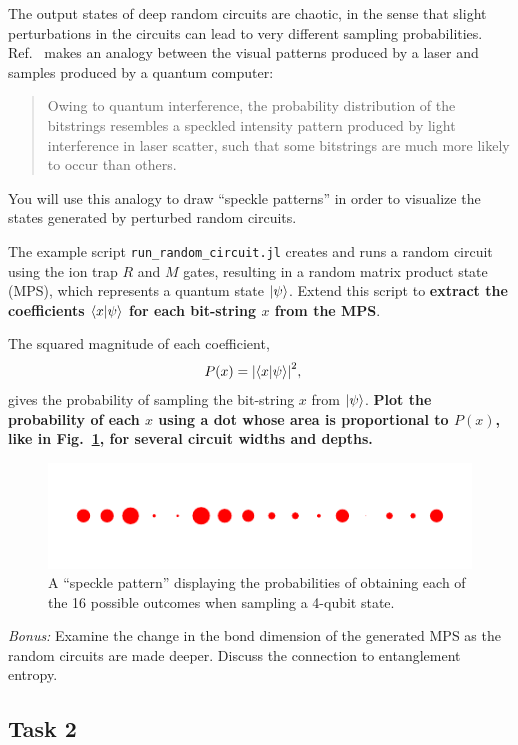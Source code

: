 \documentclass[12pt]{article}
\begin{document}
The output states of deep random circuits are chaotic, in the sense that slight perturbations in the circuits can lead to very different sampling probabilities.
Ref.~ makes an analogy between the visual patterns produced by a laser and samples produced by a quantum computer:
\begin{quote}
Owing to quantum interference, the probability distribution of the bitstrings resembles a speckled intensity pattern produced by light interference in laser scatter, such that some bitstrings are much more likely to occur than others.
\end{quote}
You will use this analogy to draw ``speckle patterns'' in order to visualize the states generated by perturbed random circuits.

The example script \texttt{run\_random\_circuit.jl} creates and runs a random circuit using the ion trap $R$ and $M$ gates, resulting in a random matrix product state (MPS), which represents a quantum state $\ket{\psi}$.
Extend this script to \textbf{extract the coefficients $\ip{x}{\psi}$ for each bit-string $x$ from the MPS}.

The squared magnitude of each coefficient,
\begin{align}
	P(x)
	&= \abs{\ip{x}{\psi}}^2,
\end{align}
gives the probability of sampling the bit-string $x$ from $\ket{\psi}$.
\textbf{Plot the probability of each $x$ using a dot whose area is proportional to $P(x)$, like in Fig.~\ref{fig:speckle}, for several circuit widths and depths.}

\begin{figure}
	\centering
	\includegraphics{images/speckle_N=004,depth=032}
	\caption{
		A ``speckle pattern'' displaying the probabilities of obtaining each of the 16 possible outcomes when sampling a 4-qubit state.
	}
	\label{fig:speckle}
\end{figure}

\medskip \noindent \textit{Bonus:}
Examine the change in the bond dimension of the generated MPS as the random circuits are made deeper.
Discuss the connection to entanglement entropy.


\subsection*{Task 2}
\end{document}
